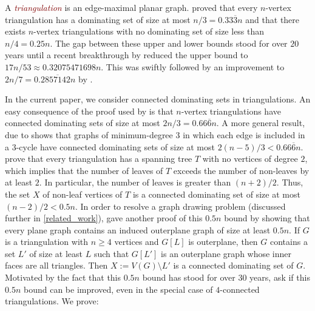 \documentclass{article}
\newcommand{\defin}[1]{\emph{\textcolor{Maroon}{#1}}}
\theoremstyle{definition}
\begin{document}
A \defin{triangulation} is an edge-maximal planar graph.  \citet{matheson.tarjan:dominating} proved that every $n$-vertex triangulation has a dominating set of size at most $n/3=0.33\overline{3}n$ and that there exists $n$-vertex triangulations with no dominating set of size less than $n/4=0.25n$. The gap between these upper and lower bounds stood for over $20$ years until a recent breakthrough by \citet{spacapan:domination} reduced the upper bound to $17n/53\approx 0.32075471698n$.  This was swiftly followed by an improvement to $2n/7= 0.2\overline{857142}n$ by \citet{christiansen.rotenberg.ea:triangulations}.

In the current paper, we consider connected dominating sets in triangulations.  An easy consequence of the proof used by \citet{matheson.tarjan:dominating} is that $n$-vertex triangulations have connected dominating sets of size at most $2n/3=0.66\overline{6}n$.  A more general result, due to  \citet{kleitman.west:spanning} shows that graphs of minimum-degree $3$ in which each edge is included in a $3$-cycle have connected dominating sets of size at most $2(n-5)/3<0.66\overline{6}n$. \citet{albertson.berman.ea:graphs} prove that every triangulation has a spanning tree $T$ with no vertices of degree $2$, which implies that the number of leaves of $T$ exceeds the number of non-leaves by at least $2$.  In particular, the number of leaves is greater than $(n+2)/2$. Thus, the set $X$ of non-leaf vertices of $T$ is a connected dominating set of size at most $(n-2)/2<0.5n$. In order to resolve a graph drawing problem (discussed further in \cref{related_work}), \citet{angelini.evans.ea:sefe} gave another proof of this $0.5n$ bound by showing that every plane graph contains an induced outerplane graph of size at least $0.5n$. If $G$ is a triangulation with $n\ge 4$ vertices and $G[L]$ is outerplane, then $G$ contains a set $L'$ of size at least $L$ such that $G[L']$ is an outerplane graph whose inner faces are all triangles.  Then $X:=V(G)\setminus L'$ is a connected dominating set of $G$. Motivated by the fact that this $0.5n$ bound has stood for over 30 years, \citet{noguchi.zamfirescu:spanning} ask if this $0.5n$ bound can be improved, even in the special case of $4$-connected triangulations. We prove:
\end{document}
